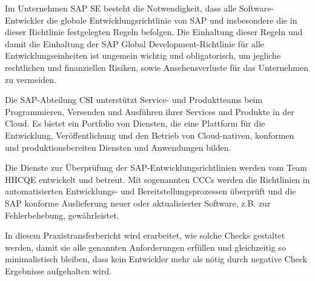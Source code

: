 \documentclass[../main.tex]{subfiles}
\begin{document}
Im Unternehmen SAP SE besteht die Notwendigkeit, dass alle Software-Entwickler die globale Entwicklungsrichtlinie von SAP und insbesondere die in dieser Richtlinie festgelegten Regeln befolgen. 
Die Einhaltung dieser Regeln und damit die Einhaltung der SAP Global Development-Richtlinie für alle Entwicklungseinheiten ist ungemein wichtig und obligatorisch, um jegliche rechtlichen und finanziellen Risiken, sowie Ansehensverluste für das Unternehmen zu vermeiden.

Die SAP-Abteilung \gls{CSI} unterstützt Service- und Produktteams beim Programmieren, Versenden und Ausführen ihrer Services und Produkte in der Cloud.
Es bietet ein Portfolio von Diensten, die eine Plattform für die Entwicklung, Veröffentlichung und den Betrieb von Cloud-nativen, konformen und produktionsbereiten Diensten und Anwendungen bilden.

Die Dienste zur Überprüfung der SAP-Entwicklungsrichtlinien werden vom Team \gls{HHCQE} entwickelt und betreut.
Mit sogenannten \glspl{CCC} werden die Richtlinien in automatisierten Entwicklungs- und Bereitstellungsprozessen überprüft und die SAP konforme Auslieferung neuer oder aktualisierter Software, z.B. zur Fehlerbehebung, gewährleistet. 

In diesem Praxistransferbericht wird erarbeitet, wie solche Checks gestaltet werden, damit sie alle genannten Anforderungen erfüllen und gleichzeitig so minimalistisch bleiben, dass kein Entwickler mehr als nötig durch negative Check Ergebnisse aufgehalten wird. 
\end{document}
